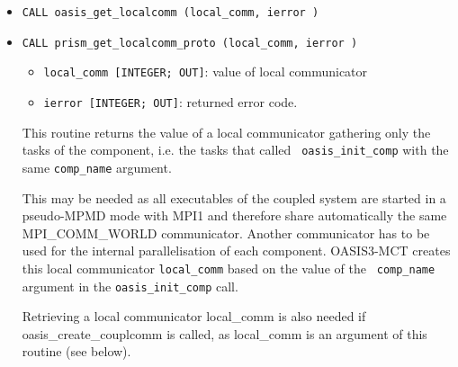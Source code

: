 \begin{itemize}
\item {\tt CALL oasis\_get\_localcomm (local\_comm, ierror )}
\item {\tt CALL prism\_get\_localcomm\_proto (local\_comm, ierror )}

  \begin{itemize}
  \item {\tt local\_comm [INTEGER; OUT]}: value of local communicator
  \item {\tt ierror [INTEGER; OUT]}: returned error code.
  \end{itemize}

  This routine returns the value of a local communicator gathering
  only the tasks of the component, i.e. the tasks that called {\tt
  oasis\_init\_comp} with the same {\tt comp\_name}
argument.

  This may be needed as all executables of the coupled system are started in a pseudo-MPMD
  mode with MPI1 and therefore share automatically the same MPI\_COMM\_WORLD
  communicator.  Another communicator has to be used for the internal
  parallelisation of each component. OASIS3-MCT creates this local
  communicator {\tt local\_comm} based on the value of the {\tt
    comp\_name} argument in the {\tt oasis\_init\_comp} call.

  Retrieving a local communicator local\_comm is also needed if
  oasis\_create\_couplcomm is called, as local\_comm is an argument of this routine (see below).

\end{itemize}

